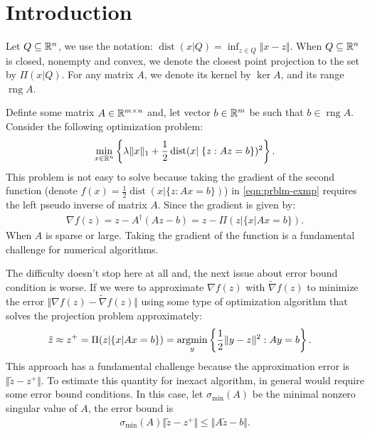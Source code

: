 \documentclass[12pt]{article}
\DeclareMathOperator{\dist}{\mathop{dist}}
\DeclareMathOperator{\rng}{\mathop{rng}}
\begin{document}
\section{Introduction}
    Let $Q \subseteq \mathbb R^n$, we use the notation: $\dist(x | Q) = \inf_{z \in Q}\Vert x - z \Vert$. 
    When $Q \subseteq \mathbb R^n$ is closed, nonempty and convex, we denote the closest point projection to the set by $\Pi(x | Q)$. 
    For any matrix $A$, we denote its kernel by $\ker A$, and its range $\rng A$. 
    \par
    Definte some matrix $A \in \mathbb R^{m \times n}$ and, let vector $b \in \mathbb R^m$ be such that $b \in \rng A$. 
    Consider the following optimization problem: 
    \begin{align}\label{eqn:prblm-exmp}
        \min_{x \in \RR^n}\left\lbrace
            \lambda\Vert x\Vert_1 + \frac{1}{2}\dist(x |\; \{z:Az = b \})^2
        \right\rbrace. 
    \end{align}
    This problem is not easy to solve because taking the gradient of the second function (denote $f(x) = \frac{1}{2}\dist(x | \{z: Ax = b\})$) in \eqref{eqn:prblm-exmp} requires the left pseudo inverse of matrix $A$. Since the gradient is given by: 
    \begin{align*}
        \nabla f(z) = z - A^\dagger (Az - b) = z - \Pi(z | \{x | Ax = b\}). 
    \end{align*}
    When $A$ is sparse or large.
    Taking the gradient of the function is a fundamental challenge for numerical algorithms. 
    \par
    The difficulty doesn't stop here at all and, the next issue about error bound condition is worse.  
    If we were to approximate $\nabla f(z)$ with $\tilde \nabla f(z)$ to minimize the error $\Vert \nabla f(z) - \tilde \nabla f(z)\Vert$ using some type of optimization algorithm that solves the projection problem approximately: 
    \begin{align*}
        \tilde z \approx z^+ = \Pi(z | \{x | Ax = b\}) &= 
        \mathop{\rm argmin}\limits_{y}\left\lbrace
            \frac{1}{2}\Vert y - z \Vert^2 : Ay = b
        \right\rbrace.
    \end{align*}
    This approach has a fundamental challenge because the approximation error is $\Vert \tilde z - z^+\Vert$. 
    To estimate this quantity for inexact algorithm, in general would require some error bound conditions. 
    In this case, let $\sigma_{\min}(A)$ be the minimal nonzero singular value of $A$, the error bound is
    \begin{align*}
        \sigma_{\min}(A)\Vert \tilde z - z^+\Vert \le \Vert A\tilde z - b\Vert. 
    \end{align*}
\end{document}
